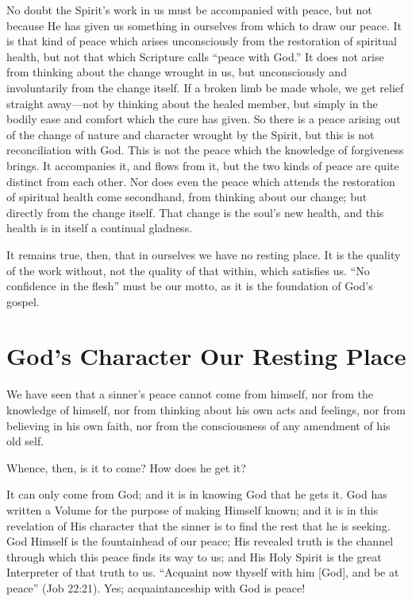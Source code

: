 \documentclass[
]{book}
\begin{document}
No doubt the Spirit's work in us must be accompanied with peace, but not because He has given us something in ourselves from which to draw our peace. It is that kind of peace which arises unconsciously from the restoration of spiritual health, but not that which Scripture calls ``peace with God.'' It does not arise from thinking about the change wrought in us, but unconsciously and involuntarily from the change itself. If a broken limb be made whole, we get relief straight away---not by thinking about the healed member, but simply in the bodily ease and comfort which the cure has given. So there is a peace arising out of the change of nature and character wrought by the Spirit, but this is not reconciliation with God. This is not the peace which the knowledge of forgiveness brings. It accompanies it, and flows from it, but the two kinds of peace are quite distinct from each other. Nor does even the peace which attends the restoration of spiritual health come secondhand, from thinking about our change; but directly from the change itself. That change is the soul's new health, and this health is in itself a continual gladness.

It remains true, then, that in ourselves we have no resting place. It is the quality of the work without, not the quality of that within, which satisfies us. ``No confidence in the flesh'' must be our motto, as it is the foundation of God's gospel.

\hypertarget{gods-character-our-resting-place}{%
\chapter{God's Character Our Resting Place}\label{gods-character-our-resting-place}}

We have seen that a sinner's peace cannot come from himself, nor from the knowledge of himself, nor from thinking about his own acts and feelings, nor from believing in his own faith, nor from the consciousness of any amendment of his old self.

Whence, then, is it to come? How does he get it?

It can only come from God; and it is in knowing God that he gets it. God has written a Volume for the purpose of making Himself known; and it is in this revelation of His character that the sinner is to find the rest that he is seeking. God Himself is the fountainhead of our peace; His revealed truth is the channel through which this peace finds its way to us; and His Holy Spirit is the great Interpreter of that truth to us. ``Acquaint now thyself with him {[}God{]}, and be at peace'' (Job 22:21). Yes; acquaintanceship with God is peace!
\end{document}
